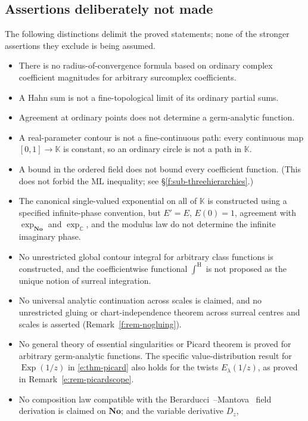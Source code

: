 \documentclass[11pt,a4paper]{article}
\numberwithin{equation}{section}
\theoremstyle{definition}
\theoremstyle{remark}
\theoremstyle{plain}
\newcommand{\K}{\mathbb K}
\newcommand{\No}{\mathbf{No}}
\newcommand{\CC}{\mathbb C}
\DeclareMathOperator{\Exp}{Exp}
\newcommand{\intH}{{\int^{\mathrm H}}}
\begin{document}
\subsection{Assertions deliberately not made}\label{f:sub-notmade}

The following distinctions delimit the proved statements; none of the
stronger assertions they exclude is being assumed.

\begin{itemize}[leftmargin=1.4em]
\item There is no radius-of-convergence formula based on ordinary
 complex coefficient magnitudes for arbitrary surcomplex coefficients.
\item A Hahn sum is not a fine-topological limit of its ordinary partial
 sums.
\item Agreement at ordinary points does not determine a germ-analytic
 function.
\item A real-parameter contour is not a fine-continuous path: every
 continuous map $[0,1]\to\K$ is constant, so an ordinary circle is not
 a path in $\K$.
\item A bound in the ordered field does not bound every coefficient
 function.  (This does not forbid the $\mathrm{ML}$ inequality; see
 \S\ref{f:sub-threehierarchies}.)
\item The canonical single-valued exponential on all of $\K$ is
 constructed using a specified infinite-phase convention, but $E'=E$, $E(0)=1$, agreement with $\exp_{\No}$ and
 $\exp_{\CC}$, and the modulus law do not determine the infinite
 imaginary phase.
\item No unrestricted global contour integral for arbitrary class
 functions is constructed, and the coefficientwise functional $\intH$ is
 not proposed as the unique notion of surreal integration.
\item No universal analytic continuation across scales is claimed, and
 no unrestricted gluing or chart-independence theorem across surreal
 centres and scales is asserted (Remark~\ref{f:rem-nogluing}).
\item No general theory of essential singularities or Picard theorem
 is proved for arbitrary germ-analytic functions. The specific
 value-distribution result for $\Exp(1/z)$ in \ref{e:thm-picard}
 also holds for the twists $E_\lambda(1/z)$, as proved in
 Remark~\ref{e:rem-picardscope}.
\item No composition law compatible with the Berarducci~\cite{BMder}--Mantova~\cite{Mantova2026b} field
 derivation is claimed on $\No$; and the variable derivative $D_{z}$,

\end{itemize}
\end{document}
